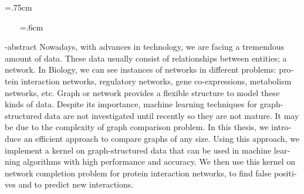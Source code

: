 {\small
{\baselineskip=.75cm
%
%
\clearpage{\pagestyle{empty}\cleardoublepage}
\printglossary
}
\clearpage{\pagestyle{empty}\cleardoublepage}


\clearpage{\pagestyle{empty}\cleardoublepage}
}
\newpage
\thispagestyle{empty}
\clearpage
~~~
\baselineskip=.6cm
\begin{latin}
\en-abstract{\noindent
Nowadays, with advances in technology, we are facing a tremendous amount of data. These data usually consist of relationships between entities; a network. In Biology, we can see instances of networks in different problems: protein interaction networks, regulatory networks, gene co-expressions, metabolism networks, etc. Graph or network provides a flexible structure to model these kinds of data. Despite its importance, machine learning techniques for graph-structured data are not investigated until recently so they are not mature. It may be due to the complexity of graph comparison problem. In this thesis, we introduce an efficient approach to compare graphs of any size. Using this approach, we implement a kernel on graph-structured data that can be used in machine learning algorithms with high performance and accuracy. We then use this kernel on network completion problem for protein interaction networks, to find false positives and to predict new interactions.
}
\latinvtitle
\end{latin}
\label{LastPage}
